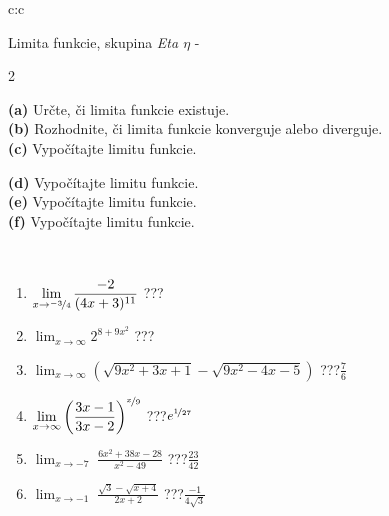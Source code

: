 \documentclass[10pt]{report}
\begin{document}
\thispagestyle{empty}
\begin{tabular}{c:c}
\begin{minipage}[c][104.5mm][t]{0.5\linewidth}
\begin{center}
\vspace{7mm}
{\huge Limita funkcie, skupina \textit{Eta $\eta$} -}\\[5mm]
\begin{minipage}{0.95\linewidth}
\begin{center}
{\small \begin{multicols}{2} \raggedright
\textbf{(a)} Určte, či limita funkcie existuje. \\[1mm]
\textbf{(b)} Rozhodnite, či limita funkcie konverguje alebo diverguje. \\[1mm]
\textbf{(c)} Vypočítajte limitu funkcie. \par \columnbreak
\textbf{(d)} Vypočítajte limitu funkcie. \\[1mm]
\textbf{(e)} Vypočítajte limitu funkcie. \\[1mm]
\textbf{(f)} Vypočítajte limitu funkcie. \\[1mm]
\end{multicols}
}
\end{center}
\end{minipage}
\\[4mm]
\begin{minipage}{0.79\linewidth}
\begin{center}
\begin{varwidth}{\linewidth}
\begin{enumerate}
\normalsize
\item $\displaystyle\lim_{x\to\nicefrac{-3}{4}}{\frac{-2}{(4x+3)^{11}}}$\quad \dotfill\; ???\;\dotfill \quad {}
\item $\displaystyle\lim_{x\to\infty}{2^{8+9x^2}}$\quad \dotfill\; ???\;\dotfill \quad {}
\item $\displaystyle\lim_{x\to\infty}{\left(\sqrt{9x^2+3x+1} - \sqrt{9x^2-4x-5}\right)}$\quad \dotfill\; ???\;\dotfill \quad $\frac{7}{6}$
\item $\displaystyle\lim_{x\to\infty}{\left( \frac{3x-1}{3x-2} \right)^{\nicefrac{x}{9}}}$\quad \dotfill\; ???\;\dotfill \quad $e^{\nicefrac{1}{27}}$
\item $\displaystyle\lim_{x\to -7}{\;\frac{6x^2+38x-28}{x^2-49}}$\quad \dotfill\; ???\;\dotfill \quad $\frac{23}{42}$
\item $\displaystyle\lim_{x\to -1}{\;\frac{\sqrt{3}-\sqrt{x+4}}{2x+2}}$\quad \dotfill\; ???\;\dotfill \quad $\frac{-1}{4\sqrt{3}}$

\end{enumerate}
\end{varwidth}
\end{center}
\end{minipage}
\end{center}
\end{minipage}
\end{tabular}
\end{document}
